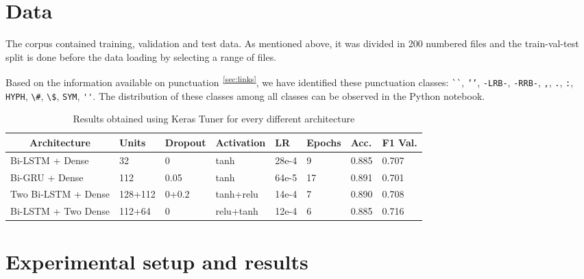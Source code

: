 \documentclass[11pt]{article}
\begin{document}
\section{Data}
\label{sec:data}


The corpus contained training, validation and test data.
As mentioned above, it was divided in 200 numbered files and the train-val-test split is done before the data loading by selecting a range of files.

Based on the information available on punctuation\textsuperscript{~\ref{sec:links}}, we have identified these punctuation classes: \verb|``|,  \verb|’’|,  \verb|-LRB-|,  \verb|-RRB-|, 
 \verb|,|,  \verb|.|,  \verb|:|,  \verb|HYPH|,  \verb|\#|,  \verb|\$|, 
 \verb|SYM|,  \verb|''|.
The distribution of these classes among all classes can be observed in the Python notebook.

\begin{table*}[!t]
\begin{tabular}{l|l|l|l|l|l|l|l}
\multicolumn{1}{c|}{\textbf{Architecture}} & \textbf{Units} & \textbf{Dropout} & \textbf{Activation} & \textbf{LR} & \textbf{Epochs} & \textbf{Acc.} & \multicolumn{1}{c}{\textbf{F1 Val.}} \\ \hline
Bi-LSTM + Dense		& 32		& 0		& tanh		& 28e-4	& 9 	& 0.885	& 0.707	\\
Bi-GRU + Dense		& 112		& 0.05	& tanh		& 64e-5	& 17	& 0.891	& 0.701	\\
Two Bi-LSTM + Dense	& 128+112	& 0+0.2	& tanh+relu	& 14e-4	& 7		& 0.890	& 0.708	\\
Bi-LSTM + Two Dense	& 112+64    & 0		& relu+tanh	& 12e-4	& 6		& 0.885	& 0.716
\end{tabular}
\caption{Results obtained using Keras Tuner for every different architecture}
\label{table:tuner}
\end{table*}



\section{Experimental setup and results}
\label{sec:results}
\end{document}
